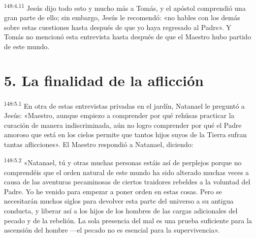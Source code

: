 \par 
\textsuperscript{148:4.11} Jesús dijo todo esto y mucho más a Tomás, y el apóstol comprendió una gran parte de ello; sin embargo, Jesús le recomendó: «no hables con los demás sobre estas cuestiones hasta después de que yo haya regresado al Padre». Y Tomás no mencionó esta entrevista hasta después de que el Maestro hubo partido de este mundo.

\section*{5. La finalidad de la aflicción}
\par 
\textsuperscript{148:5.1} En otra de estas entrevistas privadas en el jardín, Natanael le preguntó a Jesús: «Maestro, aunque empiezo a comprender por qué rehúsas practicar la curación de manera indiscriminada, aún no logro comprender por qué el Padre amoroso que está en los cielos permite que tantos hijos suyos de la Tierra sufran tantas aflicciones». El Maestro respondió a Natanael, diciendo:

\par 
\textsuperscript{148:5.2} «Natanael, tú y otras muchas personas estáis así de perplejos porque no comprendéis que el orden natural de este mundo ha sido alterado muchas veces a causa de las aventuras pecaminosas de ciertos traidores rebeldes a la voluntad del Padre. Yo he venido para empezar a poner orden en estas cosas. Pero se necesitarán muchos siglos para devolver esta parte del universo a su antigua conducta, y liberar así a los hijos de los hombres de las cargas adicionales del pecado y de la rebelión. La sola presencia del mal es una prueba suficiente para la ascensión del hombre ---el pecado no es esencial para la supervivencia».

